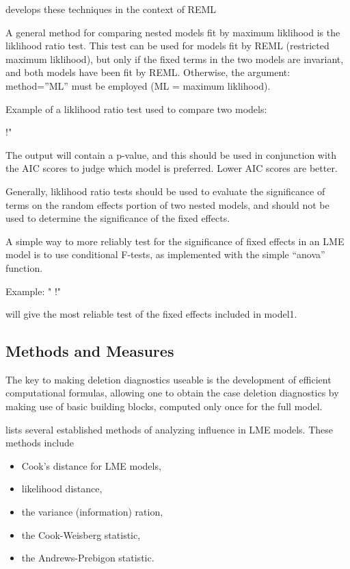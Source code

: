 \documentclass[Chap5amain.tex]{subfiles}
\begin{document}
\citet{Christiansen} develops these techniques in the context of REML

\newpage




A general method for comparing nested models fit by maximum liklihood is the liklihood ratio 
test. This test can be used for models fit by REML (restricted maximum liklihood), but only if the 
fixed terms in the two models are invariant, and both models have been fit by REML. Otherwise, 
the argument: method=”ML” must be employed (ML = maximum liklihood). 

Example of a liklihood ratio test used to compare two models: 

!"%

The output will contain a p-value, and this should be used in conjunction with the AIC scores to 
judge which model is preferred. Lower AIC scores are better. 

Generally, liklihood ratio tests should be used to evaluate the significance of terms on the 
random effects portion of two nested models, and should not be used to determine the 
significance of the fixed effects. 

A simple way to more reliably test for the significance of fixed effects in an LME model is to use 
conditional F-tests, as implemented with the simple “anova” function. 

Example: 
"
!"%

will give the most reliable test of the fixed effects included in model1. 





\subsection{Methods and Measures}
The key to making deletion diagnostics useable is the development of efficient computational formulas, allowing one to obtain the  case deletion diagnostics by making use of basic building blocks, computed only once for the full model.


\citet{Zewotir} lists several established methods of analyzing influence in LME models. These methods include \begin{itemize}
	\item Cook's distance for LME models,
	\item {} likelihood distance,
	\item the variance (information) ration,
	\item the  Cook-Weisberg statistic,
	\item the  Andrews-Prebigon statistic.
\end{itemize}
\end{document}
